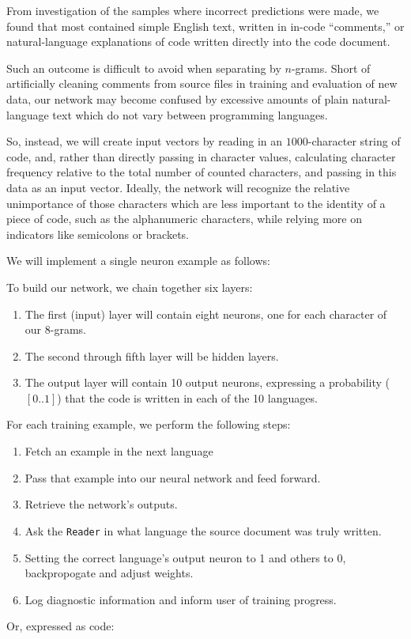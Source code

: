 \documentclass{article}
\begin{document}
From investigation of the samples where incorrect predictions were made, we found that most contained simple English text, written in in-code ``comments,'' or natural-language explanations of code written directly into the code document.

Such an outcome is difficult to avoid when separating by $n$-grams. Short of artificially cleaning comments from source files in training and evaluation of new data, our network may become confused by excessive amounts of plain natural-language text which do not vary between programming languages.

So, instead, we will create input vectors by reading in an $1000$-character string of code, and, rather than directly passing in character values, calculating character frequency relative to the total number of counted characters, and passing in this data as an input vector. Ideally, the network will recognize the relative unimportance of those characters which are less important to the identity of a piece of code, such as the alphanumeric characters, while relying more on indicators like semicolons or brackets.

We will implement a single neuron example as follows:

To build our network, we chain together six layers:
\begin{enumerate}
  \item{The first (input) layer will contain eight neurons, one for each character of our 8-grams.}
  \item{The second through fifth layer will be hidden layers.}
  \item{The output layer will contain 10 output neurons, expressing a probability ($[0..1]$) that the code is written in each of the 10 languages.}
\end{enumerate}

For each training example, we perform the following steps:
\begin{enumerate}
  \item{Fetch an example in the next language}
  \item{Pass that example into our neural network and feed forward.}
  \item{Retrieve the network's outputs.}
  \item{Ask the \texttt{Reader}  in what language the source document was truly written.}
  \item{Setting the correct language's output neuron to 1 and others to 0, backpropogate and adjust weights.}
  \item{Log diagnostic information and inform user of training progress.}
\end{enumerate}
Or, expressed as code:
\end{document}
